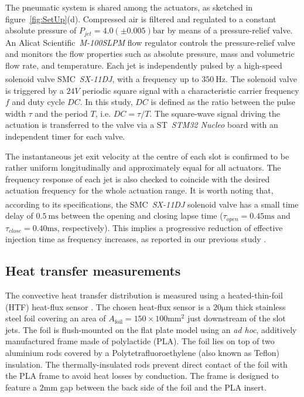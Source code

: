 The pneumatic system is shared among the actuators, as sketched in figure~\ref{fig:SetUp}(d). Compressed air is filtered and regulated to a constant absolute pressure of $P_{jet} = 4.0 (\pm0.005)\mathrm{bar}$ by means of a pressure-relief valve. An Alicat Scientific\texttrademark~\textit{M-100SLPM} flow regulator controls the pressure-relief valve and monitors the flow properties such as absolute pressure, mass and volumetric flow rate, and temperature. Each jet is independently pulsed by a high-speed solenoid valve SMC\textsuperscript{\textregistered}~\textit{SX-11DJ}, with a frequency up to $350~\mathrm{Hz}$. The solenoid valve is triggered by a $24V$ periodic square signal with a characteristic carrier frequency $f$ and duty cycle $DC$. In this study, $DC$ is defined as the ratio between the pulse width $\tau$ and the period $T$, i.e. $DC=\tau/T$.
The square-wave signal driving the actuation is transferred to the valve via a ST\texttrademark~\textit{STM32 Nucleo} board with an independent timer for each valve. 

The instantaneous jet exit velocity at the centre of each slot is confirmed to be rather uniform longitudinally and approximately equal for all actuators. The frequency response of each jet is also checked to coincide with the desired actuation frequency for the whole actuation range. It is worth noting that, according to its specifications, the SMC\textsuperscript{\textregistered}~\textit{SX-11DJ} solenoid valve has a small time delay of $0.5~\mathrm{ms}$ between the opening and closing lapse time ($\tau_{open} = 0.45\mathrm{ms}$ and $\tau_{close} = 0.40\mathrm{ms}$, respectively). This implies a progressive reduction of effective injection time as frequency increases, as reported in our previous study \citet{Castellanos2022slotjet}.

\subsection{Heat transfer measurements \label{ss:IR}}
The convective heat transfer distribution is measured using a heated-thin-foil (HTF) heat-flux sensor \citep{astarita2012infrared}. The chosen heat-flux sensor is a $20\mathrm{\mu m}$ thick stainless steel foil covering an area of $A_{\mathrm{foil}}=150\times 100\mathrm{mm}^2$ just downstream of the slot jets. The foil is flush-mounted on the flat plate model using an \textit{ad hoc}, additively manufactured frame made of polylactide (PLA). The foil lies on top of two aluminium rods covered by a Polytetrafluoroethylene (also known as Teflon) insulation. The thermally-insulated rods prevent direct contact of the foil with the PLA frame to avoid heat losses by conduction. The frame is designed to feature a $2 \mathrm{mm}$ gap between the back side of the foil and the PLA insert. 

